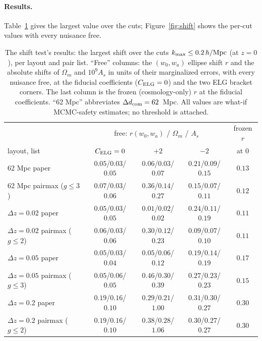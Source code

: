 \documentclass[11pt]{article}
\newcommand{\kmax}{k_{\rm max}}
\newcommand{\hMpc}{\,h/{\rm Mpc}}
\newcommand{\dcom}{$\Delta d_{\rm com} = 62$~Mpc}
\begin{document}
\paragraph{Results.}
Table~\ref{tab:shifts} gives the largest value over the cuts;
Figure~\ref{fig:shift} shows the per-cut values with every nuisance
free.

\begin{table}[tbp]
  \centering
  \small
  \setlength{\tabcolsep}{4pt}
  \begin{tabular}{lcccc}
    \toprule
    & \multicolumn{3}{c}{free: $r(w_0,w_a)$ / $\Omega_m$ / $A_s$} &
      frozen $r$ \\
    layout, list & $C_{\rm ELG} = 0$ & $+2$ & $-2$ & at $0$ \\
    \midrule
    62 Mpc paper             & $0.05$/$0.03$/$0.05$ & $0.06$/$0.03$/$0.07$ & $0.21$/$0.09$/$0.15$ & $0.13$ \\
    62 Mpc pairmax ($g \le 3$) & $0.07$/$0.03$/$0.06$ & $0.36$/$0.14$/$0.27$ & $0.15$/$0.07$/$0.11$ & $0.12$ \\
    $\Delta z = 0.02$ paper  & $0.05$/$0.03$/$0.05$ & $0.01$/$0.02$/$0.02$ & $0.24$/$0.11$/$0.19$ & $0.11$ \\
    $\Delta z = 0.02$ pairmax ($g \le 2$) & $0.06$/$0.03$/$0.06$ & $0.30$/$0.12$/$0.23$ & $0.09$/$0.07$/$0.10$ & $0.11$ \\
    $\Delta z = 0.05$ paper  & $0.05$/$0.03$/$0.04$ & $0.05$/$0.06$/$0.12$ & $0.19$/$0.14$/$0.19$ & $0.17$ \\
    $\Delta z = 0.05$ pairmax ($g \le 3$) & $0.05$/$0.06$/$0.05$ & $0.46$/$0.30$/$0.39$ & $0.27$/$0.23$/$0.23$ & $0.15$ \\
    $\Delta z = 0.2$ paper   & $0.19$/$0.16$/$0.10$ & $0.29$/$0.21$/$1.00$ & $0.31$/$0.30$/$0.27$ & $0.30$ \\
    $\Delta z = 0.2$ pairmax ($g \le 2$) & $0.19$/$0.16$/$0.10$ & $0.38$/$0.28$/$1.06$ & $0.30$/$0.27$/$0.27$ & $0.30$ \\
    \bottomrule
  \end{tabular}
  \caption{The shift test's results: the largest shift over the cuts
    $\kmax \le 0.2\hMpc$ (at $z = 0$), per layout and pair list.
    ``Free'' columns: the $(w_0, w_a)$ ellipse shift $r$ and the
    absolute shifts of $\Omega_m$ and $10^9 A_s$ in units of their
    marginalized errors, with every nuisance free, at the fiducial
    coefficients ($C_{\rm ELG} = 0$) and the two ELG bracket corners.
    The last column is the frozen (cosmology-only) $r$ at the
    fiducial coefficients.  ``62 Mpc'' abbreviates \dcom{}.  All
    values are what-if MCMC-safety estimates; no threshold is
    attached.}
  \label{tab:shifts}
\end{table}
\end{document}
